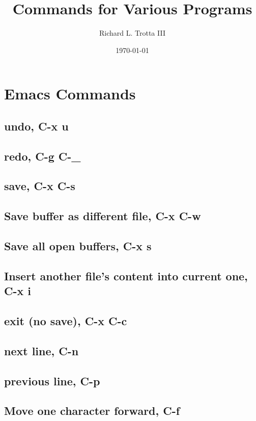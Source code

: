 \documentclass[11pt]{article}
\author{Richard L. Trotta III}
\date{\today}
\title{Commands for Various Programs}
\begin{document}
\maketitle
\tableofcontents

\section{Emacs Commands}
\label{sec:org748170b}
\subsection{undo, C-x u}
\label{sec:org92fa04e}
\subsection{redo, C-g C-\_}
\label{sec:org763760a}
\subsection{save, C-x C-s}
\label{sec:org7b34e16}
\subsection{Save buffer as different file, C-x C-w}
\label{sec:orge32e277}
\subsection{Save all open buffers, C-x s}
\label{sec:orgb182397}
\subsection{Insert another file's content into current one, C-x i}
\label{sec:orgac2dd5f}
\subsection{exit (no save), C-x C-c}
\label{sec:org1f57953}
\subsection{next line, C-n}
\label{sec:org6f8885e}
\subsection{previous line, C-p}
\label{sec:org62dbdbd}
\subsection{Move one character forward, C-f}
\label{sec:org7eae59e}
\end{document}
